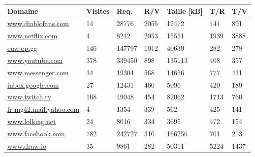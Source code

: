 \begin{table}[]
\centering
\begin{tabular}{lllllll}
\textbf{Domaine}          & \textbf{Visites} & \textbf{Req.} & \textbf{R/V} & \textbf{Taille [kB]} & \textbf{T/R} & \textbf{T/V} \\ \hline
\scriptsize \url{www.diablofans.com}        & 14             & 28776         & 2055                           & 12472         & 444                     & 891                       \\
\scriptsize \url{www.netflix.com}           & 4              & 8212          & 2053                           & 15551         & 1939                    & 3888                      \\
\scriptsize \url{euw.op.gg}                 & 146            & 147797        & 1012                           & 40639         & 282                     & 278                       \\
\scriptsize \url{www.youtube.com}           & 378            & 339450        & 898                            & 135113        & 408                     & 357                       \\
\scriptsize \url{www.messenger.com}         & 34             & 19304         & 568                            & 14656         & 777                     & 431                       \\
\scriptsize \url{inbox.google.com}          & 27             & 12431         & 460                            & 5096          & 420                     & 189                       \\
\scriptsize \url{www.twitch.tv}             & 108            & 49048         & 454                            & 82062         & 1713                    & 760                       \\
\scriptsize \url{fr-mg42.mail.yahoo.com}    & 4              & 1354          & 339                            & 562           & 425                     & 141                       \\
\scriptsize \url{www.lolking.net}           & 24             & 8016          & 334                            & 3695          & 472                     & 154                       \\
\scriptsize \url{www.facebook.com}          & 782            & 242727        & 310                            & 166256        & 701                     & 213                       \\
\scriptsize \url{www.draw.io}               & 35             & 9861          & 282                            & 50311         & 5224                    & 1437                      \\

\end{tabular}
\end{table}
